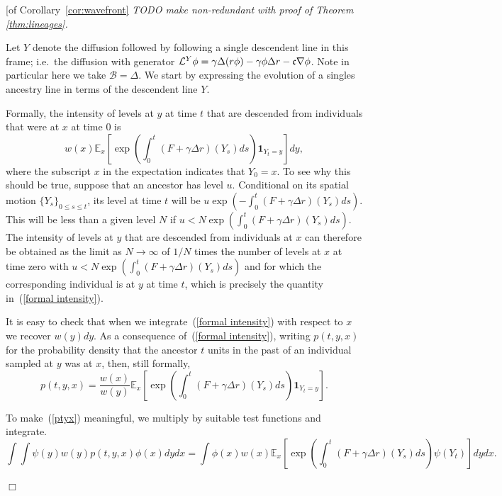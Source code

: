 \documentclass[12pt]{article}
\newenvironment {proof}{{\noindent\bf Proof }}{\hfill $\Box$ \medskip}
\newcommand{\IE}{\mathbb E}
\newcommand{\ind}{\mathbf{1}}
\newcommand{\comment}[1]{{\color{blue} \it #1}}
\begin{document}
\begin{proof}[of Corollary~\ref{cor:wavefront}
    \comment{
        TODO make non-redundant with proof of Theorem \ref{thm:lineages}.
    }

Let $Y$ denote the diffusion followed by following a single descendent line in this frame; 
i.e.~the diffusion with generator ${\cal L}^Y\phi=\gamma\Delta(r\phi)-\gamma\phi\Delta r -\mathfrak{c}\nabla\phi $. Note in particular here we take $\mathcal{B}=\Delta$. We start by expressing the evolution of a singles ancestry line in terms of the descendent line $Y$.

Formally, the intensity of levels at $y$ at time $t$ that are descended from 
individuals that were at $x$ at time $0$ is
\begin{equation}
\label{formal intensity}
w(x)\IE_x\left[\exp\left(\int_0^t (F+\gamma \Delta r)(Y_s)ds\right)\ind_{Y_t=y}\right]dy,
\end{equation}
where the subscript $x$ in the expectation indicates that $Y_0=x$.
To see why this should be true, 
suppose that an ancestor has level $u$. Conditional on its 
spatial motion $\{Y_s\}_{0\leq s\leq t}$, its level at time $t$ will
be $u\exp(-\int_0^t(F+\gamma\Delta r)(Y_s)ds)$. This will be less than a given level 
$N$ if $u<N \exp(\int_0^t(F+\gamma\Delta r)(Y_s)ds)$. 
The intensity of levels at $y$ that are descended from individuals at
$x$ can therefore be obtained as the limit as $N\to\infty$ of 
$1/N$ times the number of levels at $x$ at time zero with
$u<N \exp(\int_0^t(F+\gamma\Delta r)(Y_s)ds)$ and for which
the corresponding individual is at $y$ at time $t$, which is 
precisely the quantity in~(\ref{formal intensity}). 

It is easy to check that when we integrate~(\ref{formal intensity})
with respect to $x$ we recover $w(y)dy$. 
As a consequence of~(\ref{formal intensity}), writing $p(t,y,x)$ for
the probability density that the ancestor $t$ units in 
the past of an individual sampled 
at $y$ was at $x$, then, still formally,
\begin{equation}
\label{ptyx}
p(t,y,x)=\frac{w(x)}{w(y)}\IE_x\left[\exp\left(\int_0^t (F+\gamma\Delta r)(Y_s)ds\right)
\ind_{Y_t=y}\right].
\end{equation}

To make~(\ref{ptyx}) meaningful, we multiply by suitable test functions and 
integrate.
$$\int\int \psi(y)w(y)p(t,y,x)\phi(x)dydx=\int\phi(x)w(x)
\IE_x\left[\exp\left(\int_0^t(F+\gamma\Delta r)(Y_s)ds\right)\psi(Y_t)\right]dydx.$$


\end{proof}
\end{document}
